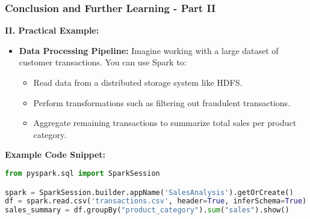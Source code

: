 \documentclass[aspectratio=169]{beamer}
\begin{document}
\begin{frame}[fragile]
    \frametitle{Conclusion and Further Learning - Part II}
    \textbf{II. Practical Example:}
    \begin{itemize}
        \item \textbf{Data Processing Pipeline:} Imagine working with a large dataset of customer transactions. You can use Spark to:
        \begin{itemize}
            \item Read data from a distributed storage system like HDFS.
            \item Perform transformations such as filtering out fraudulent transactions.
            \item Aggregate remaining transactions to summarize total sales per product category.
        \end{itemize}
    \end{itemize}

    \textbf{Example Code Snippet:}
    \begin{lstlisting}[language=Python]
from pyspark.sql import SparkSession

spark = SparkSession.builder.appName('SalesAnalysis').getOrCreate()
df = spark.read.csv('transactions.csv', header=True, inferSchema=True)
sales_summary = df.groupBy("product_category").sum("sales").show()
    \end{lstlisting}
\end{frame}
\end{document}
